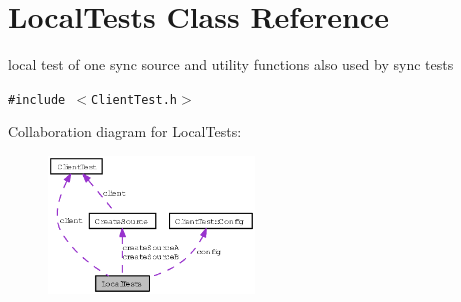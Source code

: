 \section{Local\-Tests Class Reference}
\label{classLocalTests}
local test of one sync source and utility functions also used by sync tests  


{\tt \#include $<$Client\-Test.h$>$}

Collaboration diagram for Local\-Tests:\begin{figure}[H]
\begin{center}
\leavevmode
\includegraphics[width=155pt]{classLocalTests__coll__graph}
\end{center}
\end{figure}
